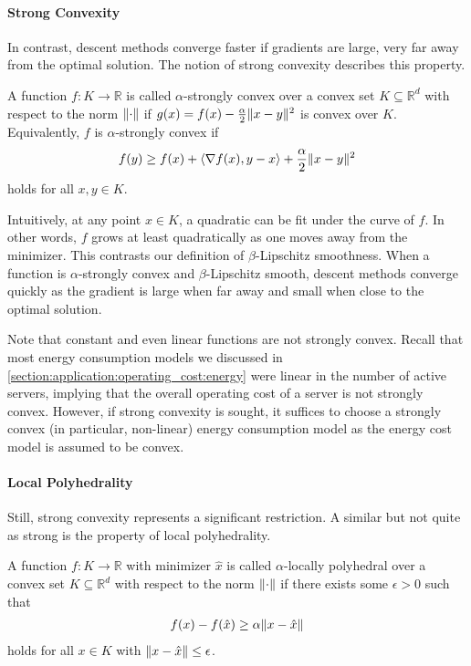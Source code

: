 \paragraph{Strong Convexity} In contrast, descent methods converge faster if gradients are large, very far away from the optimal solution. The notion of strong convexity describes this property.

\begin{definition}
\cite{Gupta2020} A function $f : K \to \mathbb{R}$ is called $\alpha$-strongly convex over a convex set $K \subseteq \mathbb{R}^d$ with respect to the norm $\lVert\cdot\rVert$ if $g(x) = f(x) - \frac{\alpha}{2}\lVert x-y\rVert^2$ is convex over $K$. Equivalently, $f$ is $\alpha$-strongly convex if \begin{align*}
    f(y) \geq f(x) + \langle\nabla f(x), y-x\rangle + \frac{\alpha}{2}\lVert x-y\rVert^2
\end{align*} holds for all $x, y \in K$.
\end{definition}

Intuitively, at any point $x \in K$, a quadratic can be fit under the curve of $f$. In other words, $f$ grows at least quadratically as one moves away from the minimizer. This contrasts our definition of $\beta$-Lipschitz smoothness. When a function is $\alpha$-strongly convex and $\beta$-Lipschitz smooth, descent methods converge quickly as the gradient is large when far away and small when close to the optimal solution.

Note that constant and even linear functions are not strongly convex. Recall that most energy consumption models we discussed in \cref{section:application:operating_cost:energy} were linear in the number of active servers, implying that the overall operating cost of a server is not strongly convex. However, if strong convexity is sought, it suffices to choose a strongly convex (in particular, non-linear) energy consumption model as the energy cost model is assumed to be convex.

\paragraph{Local Polyhedrality} Still, strong convexity represents a significant restriction. A similar but not quite as strong is the property of local polyhedrality.

\begin{definition}
\cite{Goel2018} A function $f : K \to \mathbb{R}$ with minimizer $\hat{x}$ is called $\alpha$-locally polyhedral over a convex set $K \subseteq \mathbb{R}^d$ with respect to the norm $\lVert\cdot\rVert$ if there exists some $\epsilon > 0$ such that \begin{align*}
    f(x) - f(\hat{x}) \geq \alpha \lVert x - \hat{x}\rVert
\end{align*} holds for all $x \in K$ with $\lVert x - \hat{x}\rVert \leq \epsilon$.
\end{definition}


